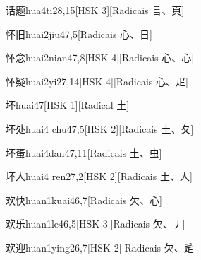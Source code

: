 \begin{entry}{话题}{hua4ti2}{8,15}[HSK 3][Radicais ⾔、⾴]
\end{entry}

\begin{entry}{怀旧}{huai2jiu4}{7,5}[Radicais ⼼、⽇]
\end{entry}

\begin{entry}{怀念}{huai2nian4}{7,8}[HSK 4][Radicais ⼼、⼼]
\end{entry}

\begin{entry}{怀疑}{huai2yi2}{7,14}[HSK 4][Radicais ⼼、⽦]
\end{entry}

\begin{entry}{坏}{huai4}{7}[HSK 1][Radical ⼟]
\end{entry}

\begin{entry}{坏处}{huai4 chu4}{7,5}[HSK 2][Radicais ⼟、⼡]
\end{entry}

\begin{entry}{坏蛋}{huai4dan4}{7,11}[Radicais ⼟、⾍]
\end{entry}

\begin{entry}{坏人}{huai4 ren2}{7,2}[HSK 2][Radicais ⼟、⼈]
\end{entry}

\begin{entry}{欢快}{huan1kuai4}{6,7}[Radicais ⽋、⼼]
\end{entry}

\begin{entry}{欢乐}{huan1le4}{6,5}[HSK 3][Radicais ⽋、⼃]
\end{entry}

\begin{entry}{欢迎}{huan1ying2}{6,7}[HSK 2][Radicais ⽋、⾡]
\end{entry}

